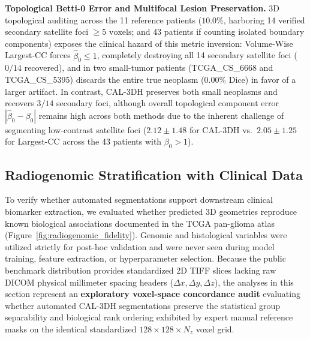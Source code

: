 \documentclass[11pt,a4paper]{article}
\begin{document}
\noindent\textbf{Topological Betti-0 Error and Multifocal Lesion Preservation.}
3D topological auditing across the 11 reference patients ($10.0\%$, harboring 14 verified secondary satellite foci $\ge 5\text{ voxels}$; and 43 patients if counting isolated boundary components) exposes the clinical hazard of this metric inversion: Volume-Wise Largest-CC forces $\hat{\beta}_0 \le 1$, completely destroying all 14 secondary satellite foci ($0/14$ recovered), and in two small-tumor patients (TCGA\_CS\_6668 and TCGA\_CS\_5395) discards the entire true neoplasm ($0.00\%$ Dice) in favor of a larger artifact. In contrast, CAL-3DH preserves both small neoplasms and recovers $3/14$ secondary foci, although overall topological component error $|\hat{\beta}_0 - \beta_0|$ remains high across both methods due to the inherent challenge of segmenting low-contrast satellite foci ($2.12 \pm 1.48$ for CAL-3DH vs.\ $2.05 \pm 1.25$ for Largest-CC across the 43 patients with $\beta_0 > 1$).

\subsection{Radiogenomic Stratification with Clinical Data}
To verify whether automated segmentations support downstream clinical biomarker extraction, we evaluated whether predicted 3D geometries reproduce known biological associations documented in the TCGA pan-glioma atlas (Figure~\ref{fig:radiogenomic_fidelity}). Genomic and histological variables were utilized strictly for post-hoc validation and were never seen during model training, feature extraction, or hyperparameter selection. Because the public benchmark distribution provides standardized 2D TIFF slices lacking raw DICOM physical millimeter spacing headers ($\Delta x, \Delta y, \Delta z$), the analyses in this section represent an \textbf{exploratory voxel-space concordance audit} evaluating whether automated CAL-3DH segmentations preserve the statistical group separability and biological rank ordering exhibited by expert manual reference masks on the identical standardized $128 \times 128 \times N_z$ voxel grid.
\end{document}
